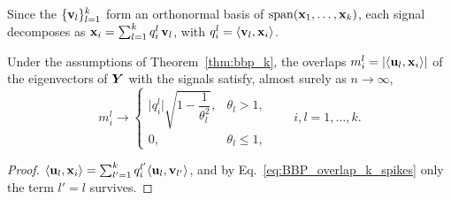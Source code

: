 \noindent
Since the $\{\boldsymbol{\mathbf{v}}_l\}_{l=1}^k$ form an orthonormal basis of $\mathrm{span}(\boldsymbol{\mathbf{x}}_1, \dots, \boldsymbol{\mathbf{x}}_k)$, each signal decomposes as $\boldsymbol{\mathbf{x}}_i = \sum_{l=1}^k q_i^l\,\boldsymbol{\mathbf{v}}_l$, with $q_i^l = \langle \boldsymbol{\mathbf{v}}_l, \boldsymbol{\mathbf{x}}_i \rangle$.

\begin{cor}\label{cor:overlap_signals}
Under the assumptions of Theorem~\ref{thm:bbp_k}, the overlaps $m_i^l = |\langle \boldsymbol{\mathbf{u}}_l, \boldsymbol{\mathbf{x}}_i \rangle|$ of the eigenvectors of $\bm{Y}$ with the signals satisfy, almost surely as $n\to\infty$,
\begin{equation}
    m_i^{l} \longrightarrow
    \begin{cases}
        \big |q_{i}^{l} \big | \sqrt{1 - \dfrac{1}{\theta_l^{2}}}, & \theta_l > 1, \\[6pt]
        0, & \theta_l \le 1,
    \end{cases}
    \qquad i, l = 1,\dots,k .
    \label{eq:overlap_signal_k-spikes}
\end{equation}
\end{cor}
\begin{proof}
$\langle \boldsymbol{\mathbf{u}}_l, \boldsymbol{\mathbf{x}}_i \rangle = \sum_{l'=1}^k q_i^{l'} \langle \boldsymbol{\mathbf{u}}_l, \boldsymbol{\mathbf{v}}_{l'} \rangle$, and by Eq.~\eqref{eq:BBP_overlap_k_spikes} only the term $l' = l$ survives.
\end{proof}
